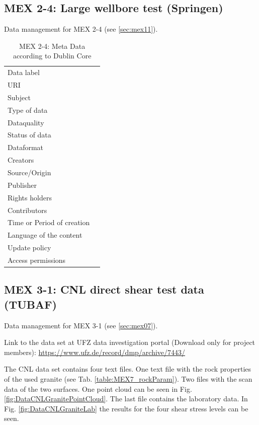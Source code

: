 \subsection{MEX 2-4: Large wellbore test (Springen)}

Data management for MEX 2-4 (see \ref{sec:mex11}).

\begin{table}[h!]
\caption{MEX 2-4: Meta Data according to Dublin Core}
\label{tab:}
\small
\begin{tabular}{R{3cm}|L{7cm}}
\hline
%
Data label &  \\
URI &  \\
Subject  &  \\
Type of data  &  \\
Dataquality  &  \\
Status of data  &  \\
Dataformat  & \\
Creators  &  \\
Source/Origin &  \\
Publisher  &  \\
Rights holders &  \\
Contributors &  \\
Time or Period of creation &  \\
Language of the content &  \\
Update policy &  \\
Access permissions &  \\
%
\hline
\end{tabular}
\end{table}

\subsection{MEX 3-1: CNL direct shear test data (TUBAF)}\label{DataManMex3-1CNL}

Data management for MEX 3-1 (see \ref{sec:mex07}).

Link to the data set at UFZ data investigation portal (Download only for project members):
\url{https://www.ufz.de/record/dmp/archive/7443/}

The CNL data set contains four text files. One text file with the rock properties of the used granite (see Tab. \ref{table:MEX7_rockParam}). Two files with the scan data of the two surfaces. One point cloud can be seen in Fig. \ref{fig:DataCNLGranitePointCloud}. The last file contains the laboratory data. In Fig. \ref{fig:DataCNLGraniteLab} the results for the four shear stress levels can be seen.

